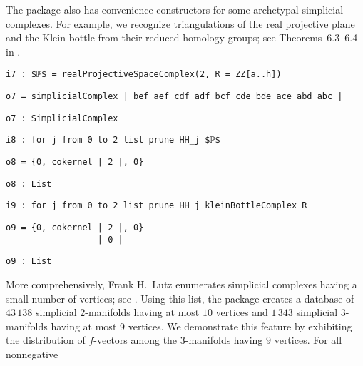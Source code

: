 \documentclass[12pt,leqno]{amsart}
\theoremstyle{definition}
\begin{document}
The package also has convenience constructors for some archetypal simplicial
complexes. For example, we recognize triangulations of the real projective
plane and the Klein bottle from their reduced homology groups; see
Theorems~6.3--6.4 in \cite{Munkres}.
\begin{lstlisting}[xleftmargin=10pt, lineskip=-5pt, aboveskip=3.0pt, belowskip=1.5pt]
i7 : $ℙ$ = realProjectiveSpaceComplex(2, R = ZZ[a..h])
\end{lstlisting}
\begin{lstlisting}[xleftmargin=10pt, aboveskip=1.5pt, belowskip=1.5pt]
o7 = simplicialComplex | bef aef cdf adf bcf cde bde ace abd abc |
\end{lstlisting}
\begin{lstlisting}[xleftmargin=10pt, aboveskip=1.5pt, belowskip=1.5pt]
o7 : SimplicialComplex
\end{lstlisting}
\begin{lstlisting}[xleftmargin=10pt, aboveskip=1.5pt, belowskip=1.5pt]
i8 : for j from 0 to 2 list prune HH_j $ℙ$
\end{lstlisting}
\begin{lstlisting}[xleftmargin=10pt, aboveskip=1.5pt, belowskip=1.5pt]
o8 = {0, cokernel | 2 |, 0}
\end{lstlisting}
\begin{lstlisting}[xleftmargin=10pt, aboveskip=1.5pt, belowskip=1.5pt]
o8 : List
\end{lstlisting}
\begin{lstlisting}[xleftmargin=10pt, aboveskip=1.5pt, belowskip=1.5pt]
i9 : for j from 0 to 2 list prune HH_j kleinBottleComplex R
\end{lstlisting}
\begin{lstlisting}[xleftmargin=10pt, lineskip=-10pt, aboveskip=4pt, belowskip=1.5pt]
o9 = {0, cokernel | 2 |, 0}
                  | 0 |
\end{lstlisting}
\begin{lstlisting}[xleftmargin=10pt, aboveskip=-5pt, belowskip=3.0pt]
o9 : List
\end{lstlisting}
More comprehensively, Frank H.~Lutz enumerates simplicial complexes having a
small number of vertices; see \cite{LutzM}.  Using this list, the package
creates a database of $43\,138$ simplicial $2$\nobreakdash-manifolds having at
most $10$ vertices and $1\,343$ simplicial $3$-manifolds having at most $9$
vertices.  We demonstrate this feature by exhibiting the distribution of
$f\!$-vectors among the $3$-manifolds having $9$ vertices.  For all nonnegative
\end{document}
